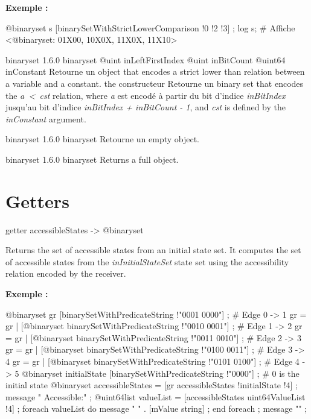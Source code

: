 \textbf{Exemple :}
\begin{galgascode}
@binaryset s [binarySetWithStrictLowerComparison !0 !2 !3] ;
log s; # Affiche <@binaryset: 01X00, 10X0X, 11X0X, 11X10>
\end{galgascode}





{binaryset}
{1.6.0}
{binaryset}
{@uint inLeftFirstIndex}
{@uint inBitCount}
{@uint64 inConstant}
{Retourne un  object that encodes a strict lower than relation between a variable and a constant.}
{the constructeur Retourne un binary set that encodes the \emph{a~<~cst} relation, where \emph {a} est encodé à partir du bit d'indice \emph{inBitIndex} jusqu'au bit d'indice \emph{inBitIndex  + inBitCount - 1}, and \emph{cst} is defined by the \emph{inConstant} argument.}





{binaryset}
{1.6.0}
{binaryset}
{Retourne un empty  object.}
{}





{binaryset}
{1.6.0}
{binaryset}
{Returns a full  object.}
{}


\section{Getters}




\begin{galgascode}
getter accessibleStates -> @binaryset
\end{galgascode}

Returns the set of accessible states from an initial state set. It computes the set of accessible states from the \emph{inInitialStateSet} state set using the accessibility relation encoded by the receiver.

\textbf{Exemple :}
\begin{galgascode}
@binaryset gr [binarySetWithPredicateString !"0001 0000"] ; # Edge 0 -> 1
gr = gr | [@binaryset binarySetWithPredicateString !"0010 0001"] ; # Edge 1 -> 2
gr = gr | [@binaryset binarySetWithPredicateString !"0011 0010"] ; # Edge 2 -> 3
gr = gr | [@binaryset binarySetWithPredicateString !"0100 0011"] ; # Edge 3 -> 4
gr = gr | [@binaryset binarySetWithPredicateString !"0101 0100"] ; # Edge 4 -> 5
@binaryset initialState [binarySetWithPredicateString !"0000"] ; # 0 is the initial state
@binaryset accessibleStates = [gr accessibleStates !initialState !4] ;
message " Accessible:" ;
@uint64list valueList = [accessibleStates uint64ValueList !4] ;
foreach valueList do
  message " " . [mValue string] ;
end foreach ;
message "\n" ;
\end{galgascode}


